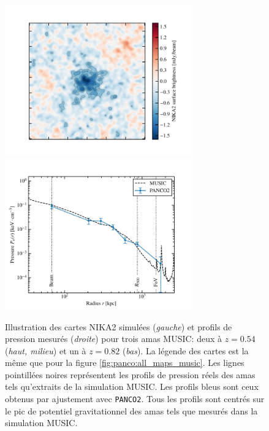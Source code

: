 \begin{figure}[p]
    \includegraphics[height=6.5cm, trim={1.4cm 0.5cm 0.8cm 1.0cm}, clip]{Figures/Chap_panco/profiles_music/Bin2_cl00047_map.pdf} \hspace{10pt}
    \includegraphics[height=6.5cm, trim={0cm 0cm 1cm 1.0cm}, clip]{Figures/Chap_panco/profiles_music_2/00047.0.82.pdf}
    \caption{Illustration des cartes NIKA2 simulées (\textit{gauche}) et profils de pression mesurés (\textit{droite}) pour trois amas MUSIC: deux à $z=0.54$ (\textit{haut, milieu}) et un à $z=0.82$ (\textit{bas}).
        La légende des cartes est la même que pour la figure \ref{fig:panco:all_maps_music}.
        Les lignes pointillées noires représentent les profils de pression réels des amas tels qu'extraits de la simulation MUSIC.
        Les profils bleus sont ceux obtenus par ajustement avec \texttt{PANCO2}.
        Tous les profils sont centrés sur le pic de potentiel gravitationnel des amas tels que mesurés dans la simulation MUSIC.
    }
    \label{fig:panco:music_profs}
\end{figure}

